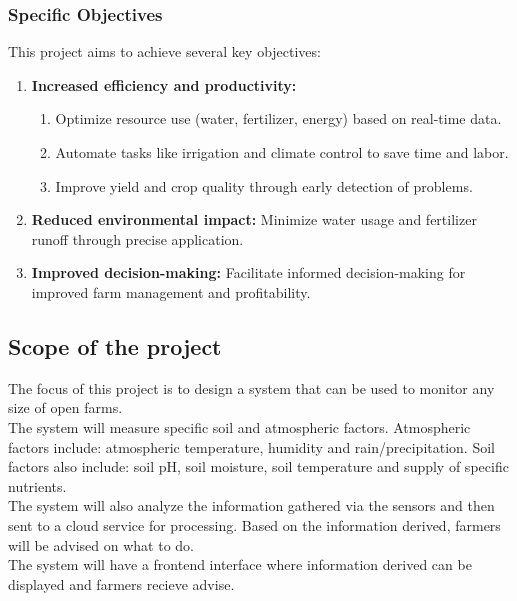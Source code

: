 \documentclass[12pt, a4paper]{article}
\begin{document}
\subsubsection{Specific Objectives}
This project aims to achieve several key objectives:\\
\begin{enumerate}
\item \textbf{Increased efficiency and productivity:}
\begin{enumerate}
 \item Optimize resource use (water, fertilizer, energy) based on real-time data.
 \item Automate tasks like irrigation and climate control to save time and labor.
 \item Improve yield and crop quality through early detection of problems.
\end{enumerate}
 
\item \textbf{Reduced environmental impact:} Minimize water usage and fertilizer runoff through precise application.\\
\item \textbf{Improved decision-making:} Facilitate informed decision-making for improved farm management and profitability.
\end{enumerate}

\newpage
\subsection{Scope of the project}
The focus of this project is to design a system that can be used to monitor any size of open farms.\\ 
The system will measure specific soil and atmospheric factors. Atmospheric factors include: atmospheric temperature, humidity and rain/precipitation. Soil factors also include: soil pH, soil moisture, soil temperature and supply of specific nutrients. \\
The system will also analyze the information gathered via the sensors and then sent to a cloud service for processing. Based on the information derived, farmers will be advised on what to do.\\
The system will have a frontend interface where information derived can be displayed and farmers recieve advise.

\newpage
\end{document}
